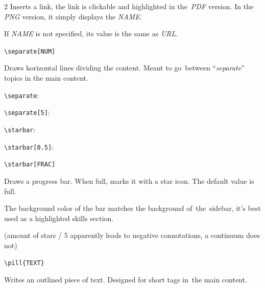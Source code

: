 \begin{paracol}{2}
    Inserts a link, the link is clickable and highlighted in the~\textit{PDF} version.
    In the \textit{PNG} version, it simply displays the \textit{NAME}.

    If \textit{NAME} is not specified, its value is the same as \textit{URL}.

    \newpage

    \verb!\separate[NUM]!

    Draws horizontal lines dividing the content.
    Meant to go~between ``\textit{separate}'' topics in the main content.

    \begingroup\color{gray}\verb!\separate!:\endgroup
    \separate

    \begingroup\color{gray}\verb!\separate[5]!:\endgroup
    \separate[5]

    \vspace{4mm}

    \switchcolumn*

    \begin{center}
      \color{page}

      \begingroup\color{lightgray}\verb!\starbar!:\endgroup
      \starbar

      \begingroup\color{lightgray}\verb!\starbar[0.5]!:\endgroup
      \starbar[0.5]

    \end{center}

    \switchcolumn

    \verb!\starbar[FRAC]!

    Draws a progress bar.
    When full, marks it with a star icon.
    The default value is full.

    The background color of the bar matches the background of~the~sidebar, it's best used as a highlighted skills section.

    (amount of stars / 5 apparently leads to negative connotations, a continuum does not)

    \vspace{4mm}

    \verb!\pill{TEXT}!

    Writes an outlined piece of text.
    Designed for short tags in~the main content.

       


    \vspace{4mm}


\end{paracol}

